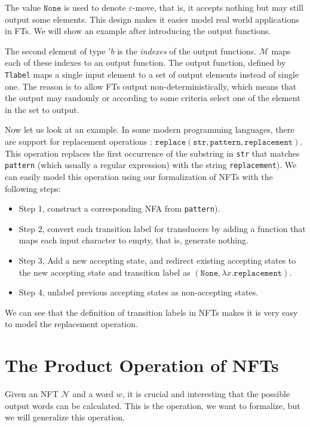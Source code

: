 \documentclass[a4paper,UKenglish,cleveref, autoref, thm-restate]{lipics-v2021}
\begin{document}
%
The value $\texttt{None}$ is used to denote $\varepsilon$-move, that is, it accepts nothing but may still output some elements. This design makes it easier model real world applications in FTs. We will show an example after introducing the output functions. 

The second element of type $'b$ is the \emph{indexes} of the output functions.  $\mathcal{M}$ maps each of these indexes to an output function. The output function, defined by \texttt{Tlabel} maps a single input element to a set of output elements instead of single one. The reason is to allow FTs output non-deterministically, which means that the output may randomly or according to some criteria select one of the element in the set to output.

Now let us look at an example. In some modern programming languages, there are support for replacement operations : $\texttt{replace}(\texttt{str}, \texttt{pattern}, \texttt{replacement})$. This operation replaces the first occurrence of the substring  in \texttt{str} that matches \texttt{pattern} (which usually a regular expression) with the string \texttt{replacement}). 
We can easily model this operation using our formalization of NFTs with the following steps:
\begin{itemize}
\item Step 1, construct a corresponding NFA from \texttt{pattern}).
\item Step 2, convert each transition label for transducers by adding a function that maps each input character to empty, that is, generate nothing.
\item Step 3, Add a new accepting state, and redirect existing accepting states to the new accepting state and transition label as $(\texttt{None}, \lambda x. \texttt{replacement})$.
\item Step 4, unlabel previous accepting states as non-accepting states. 
\end{itemize}

We can see that the definition of transition labels in NFTs makes it is very easy to model the replacement operation.

\section{The Product Operation of NFTs}
\label{sec-form-fts}

Given an NFT $\mathcal{N}$ and a word $w$, it is crucial and interesting that the possible output words can be calculated. This is the operation, we want to formalize, but we will generalize this operation.
\end{document}
